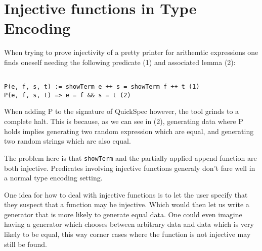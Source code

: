 \section{Injective functions in Type Encoding}
When trying to prove injectivity of a pretty printer for arithemtic expressions one
finds oneself needing the following predicate (1) and associated lemma (2):
\begin{verbatim}

P(e, f, s, t) := showTerm e ++ s = showTerm f ++ t (1)
P(e, f, s, t) => e = f && s = t (2)

\end{verbatim}
When adding P to the signature of QuickSpec however, the tool grinds to a complete halt. This is
because, as we can see in (2), generating data where P holds implies generating two
random expression which are equal, and generating two random strings which are also equal.

The problem here is that \texttt{showTerm} and the partially applied append function are both injective.
Predicates involving injective functions generaly don't fare well in a normal type encoding setting.

One idea for how to deal with injective functions is to let the user specify that they suspect that 
a function may be injective. Which would then let us write a generator that is more likely to generate
equal data. One could even imagine having a generator which chooses between arbitrary data
and data which is very likely to be equal, this way corner cases where the function is not injective may
still be found.

